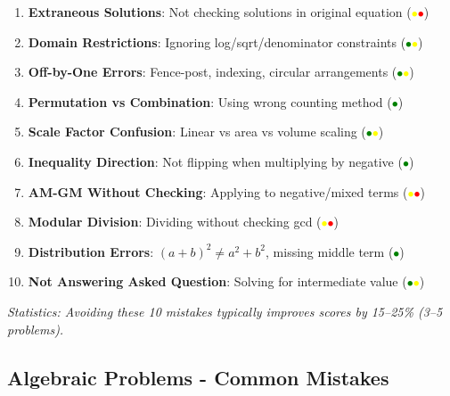 \documentclass{article}
\begin{document}
\begin{tcolorbox}[colback=red!10!white,colframe=red!75!black,title={\textbf{The 10 Most Costly Mistakes (Highest Point Loss)}}]
\begin{enumerate}[nosep]
\item \textbf{Extraneous Solutions}: Not checking solutions in original equation (\textcolor{yellow}{$\bullet$}\textcolor{red}{$\bullet$})
\item \textbf{Domain Restrictions}: Ignoring log/sqrt/denominator constraints (\textcolor{green}{$\bullet$}\textcolor{yellow}{$\bullet$})
\item \textbf{Off-by-One Errors}: Fence-post, indexing, circular arrangements (\textcolor{green}{$\bullet$}\textcolor{yellow}{$\bullet$})
\item \textbf{Permutation vs Combination}: Using wrong counting method (\textcolor{green}{$\bullet$})
\item \textbf{Scale Factor Confusion}: Linear vs area vs volume scaling (\textcolor{green}{$\bullet$}\textcolor{yellow}{$\bullet$})
\item \textbf{Inequality Direction}: Not flipping when multiplying by negative (\textcolor{green}{$\bullet$})
\item \textbf{AM-GM Without Checking}: Applying to negative/mixed terms (\textcolor{yellow}{$\bullet$}\textcolor{red}{$\bullet$})
\item \textbf{Modular Division}: Dividing without checking gcd (\textcolor{yellow}{$\bullet$}\textcolor{red}{$\bullet$})
\item \textbf{Distribution Errors}: $(a+b)^2 \neq a^2+b^2$, missing middle term (\textcolor{green}{$\bullet$})
\item \textbf{Not Answering Asked Question}: Solving for intermediate value (\textcolor{green}{$\bullet$}\textcolor{yellow}{$\bullet$})
\end{enumerate}
\textit{Statistics: Avoiding these 10 mistakes typically improves scores by 15--25\% (3--5 problems).}
\end{tcolorbox}

\subsection{Algebraic Problems - Common Mistakes}
\end{document}
